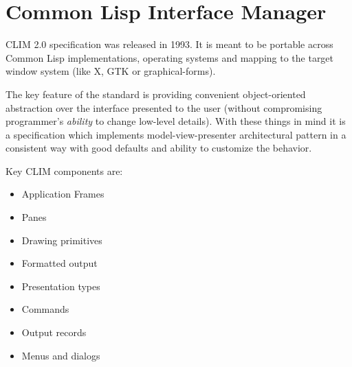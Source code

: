 \section{Common Lisp Interface Manager}

CLIM 2.0 specification was released in 1993. It is meant to be
portable across Common Lisp implementations, operating systems and
mapping to the target window system (like X, GTK or graphical-forms).

The key feature of the standard is providing convenient
object-oriented abstraction over the interface presented to the user
(without compromising programmer's \emph{ability} to change low-level
details). With these things in mind it is a specification which
implements model-view-presenter architectural pattern in a consistent
way with good defaults and ability to customize the behavior.

Key CLIM components are:

\begin{itemize}
\item Application Frames
\item Panes
\item Drawing primitives
\item Formatted output
\item Presentation types
\item Commands
\item Output records
\item Menus and dialogs
\end{itemize}